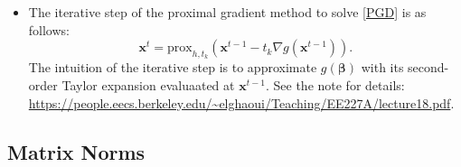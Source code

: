 \begin{itemize}
            
        \item The iterative step of the proximal gradient method to solve \eqref{PGD} is as follows:
            \begin{equation}
                    \bm{x}^t = \text{prox}_{h, t_k}\left( \bm{x}^{t-1} - t_k \nabla g(\bm{x}^{t-1}) \right).
            \end{equation}
        The intuition of the iterative step is to approximate $g(\bm{\beta})$ with its second-order Taylor expansion evaluaated at $\bm{x}^{t-1}$.
        See the note for details: \url{https://people.eecs.berkeley.edu/~elghaoui/Teaching/EE227A/lecture18.pdf}.
    \end{itemize}
    
\subsection{Matrix Norms}
